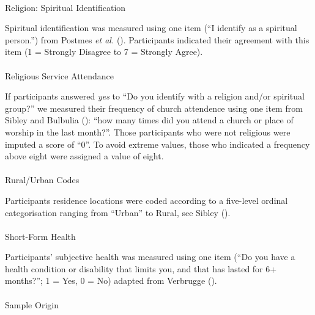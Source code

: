 \documentclass[
  single column]{article}
\makeatletter
\let\oldparagraph\paragraph
\renewcommand{\paragraph}{
    \@ifstar
      \xxxParagraphStar
      \xxxParagraphNoStar
  }
\newcommand{\xxxParagraphStar}[1]{\oldparagraph*{#1}\mbox{}}
\newcommand{\xxxParagraphNoStar}[1]{\oldparagraph{#1}\mbox{}}
\makeatother
\begin{document}
\paragraph{Religion: Spiritual
Identification}\label{religion-spiritual-identification}

Spiritual identification was measured using one item (``I identify as a
spiritual person.'') from Postmes \emph{et al.}
(). Participants indicated
their agreement with this item (1 = Strongly Disagree to 7 = Strongly
Agree).

\paragraph{Religious Service
Attendance}\label{religious-service-attendance}

If participants answered \emph{yes} to ``Do you identify with a religion
and/or spiritual group?'' we measured their frequency of church
attendence using one item from Sibley and Bulbulia
(): ``how many times did you attend a
church or place of worship in the last month?''. Those participants who
were not religious were imputed a score of ``0''. To avoid extreme
values, those who indicated a frequency above eight were assigned a
value of eight.

\paragraph{Rural/Urban Codes}\label{ruralurban-codes}

Participants residence locations were coded according to a five-level
ordinal categorisation ranging from ``Urban'' to Rural, see Sibley
().

\paragraph{Short-Form Health}\label{short-form-health}

Participants' subjective health was measured using one item (``Do you
have a health condition or disability that limits you, and that has
lasted for 6+ months?''; 1 = Yes, 0 = No) adapted from Verbrugge
().

\paragraph{Sample Origin}\label{sample-origin}
\end{document}
